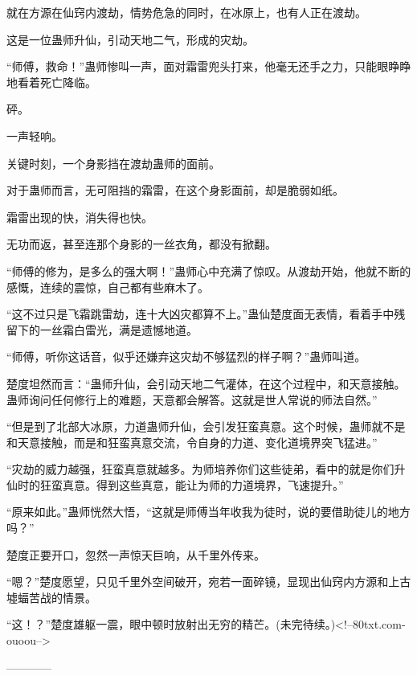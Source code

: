 \begin{this_body}
就在方源在仙窍内渡劫，情势危急的同时，在冰原上，也有人正在渡劫。

这是一位蛊师升仙，引动天地二气，形成的灾劫。

“师傅，救命！”蛊师惨叫一声，面对霜雷兜头打来，他毫无还手之力，只能眼睁睁地看着死亡降临。

砰。

一声轻响。

关键时刻，一个身影挡在渡劫蛊师的面前。

对于蛊师而言，无可阻挡的霜雷，在这个身影面前，却是脆弱如纸。

霜雷出现的快，消失得也快。

无功而返，甚至连那个身影的一丝衣角，都没有掀翻。

“师傅的修为，是多么的强大啊！”蛊师心中充满了惊叹。从渡劫开始，他就不断的感慨，连续的震惊，自己都有些麻木了。

“这不过只是飞霜跳雷劫，连十大凶灾都算不上。”蛊仙楚度面无表情，看着手中残留下的一丝霜白雷光，满是遗憾地道。

“师傅，听你这话音，似乎还嫌弃这灾劫不够猛烈的样子啊？”蛊师叫道。

楚度坦然而言：“蛊师升仙，会引动天地二气灌体，在这个过程中，和天意接触。蛊师询问任何修行上的难题，天意都会解答。这就是世人常说的师法自然。”

“但是到了北部大冰原，力道蛊师升仙，会引发狂蛮真意。这个时候，蛊师就不是和天意接触，而是和狂蛮真意交流，令自身的力道、变化道境界突飞猛进。”

“灾劫的威力越强，狂蛮真意就越多。为师培养你们这些徒弟，看中的就是你们升仙时的狂蛮真意。得到这些真意，能让为师的力道境界，飞速提升。”

“原来如此。”蛊师恍然大悟，“这就是师傅当年收我为徒时，说的要借助徒儿的地方吗？”

楚度正要开口，忽然一声惊天巨响，从千里外传来。

“嗯？”楚度愿望，只见千里外空间破开，宛若一面碎镜，显现出仙窍内方源和上古墟蝠苦战的情景。

“这！？”楚度雄躯一震，眼中顿时放射出无穷的精芒。(未完待续。)<!--80txt.com-ouoou-->

------------

\end{this_body}

